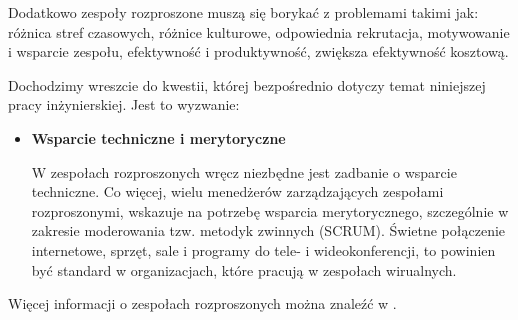 Dodatkowo zespoły rozproszone muszą się borykać z problemami takimi jak: różnica stref czasowych,
różnice kulturowe, odpowiednia rekrutacja, motywowanie i wsparcie zespołu, efektywność i produktywność,
zwiększa efektywność kosztową.

Dochodzimy wreszcie do kwestii, której bezpośrednio dotyczy temat niniejszej pracy inżynierskiej.
Jest to wyzwanie:

\begin{itemize}
	\item \textbf{Wsparcie techniczne i merytoryczne}

	W zespołach rozproszonych wręcz niezbędne jest zadbanie o wsparcie techniczne.
	Co więcej, wielu menedżerów zarządzających zespołami rozproszonymi,
	wskazuje na potrzebę wsparcia merytorycznego,
	szczególnie w zakresie moderowania tzw. metodyk zwinnych (SCRUM).
	Świetne połączenie internetowe,	sprzęt, sale i programy do tele- i wideokonferencji,
	to powinien być standard w organizacjach, które pracują w zespołach wirualnych.
\end{itemize}


Więcej informacji o zespołach rozproszonych można znaleźć w \cite{www_rozproszony}.
